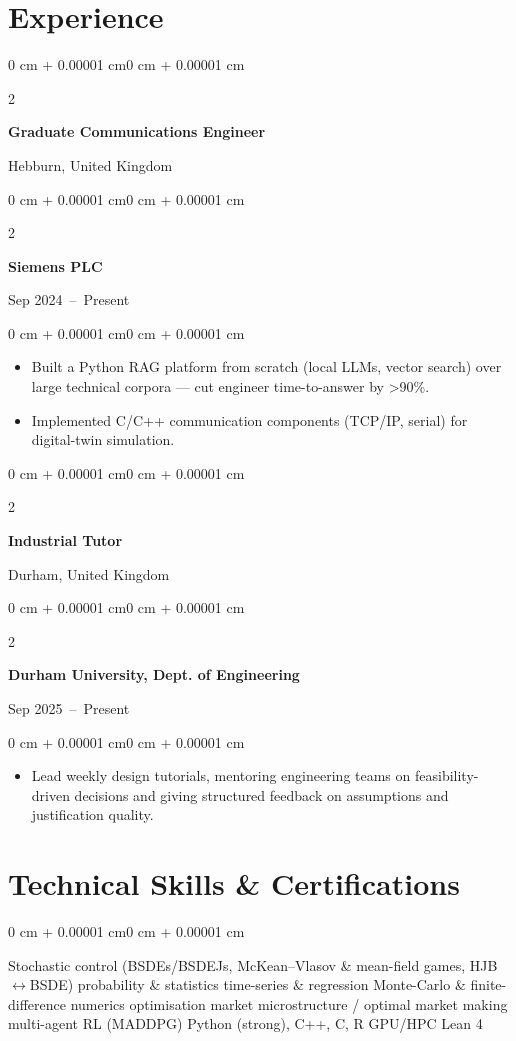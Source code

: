 \documentclass[10pt, letterpaper]{article}
\newenvironment{highlights}{
    \begin{itemize}[
        topsep=0.10 cm,
        parsep=0.10 cm,
        partopsep=0pt,
        itemsep=0pt,
        leftmargin=0 cm + 10pt
    ]
}{
    \end{itemize}
}
\newenvironment{onecolentry}{
    \begin{adjustwidth}{0 cm + 0.00001 cm}{0 cm + 0.00001 cm}
}{
    \end{adjustwidth}
}
\newenvironment{twocolentry}[2][]{
    \onecolentry{}
    \def\secondColumn{#2}
    \setcolumnwidth{\fill, 4.5 cm}
    \begin{paracol}{2}
}{
    \switchcolumn{} \raggedleft{} \secondColumn{}
    \end{paracol}
    \endonecolentry{}
}
\begin{document}
\section*{Experience}

\begin{twocolentry}
  {Hebburn, United Kingdom}
  \textbf{Graduate Communications Engineer}
\end{twocolentry}
\begin{twocolentry}
  {Sep 2024~--~Present}
  \textbf{Siemens PLC}
\end{twocolentry}
\vspace{0.10 cm}
\begin{onecolentry}
  \begin{highlights}
    \item Built a Python RAG platform from scratch (local LLMs, vector search) over large technical corpora --- cut engineer time-to-answer by >90\%.
    \item Implemented C/C++ communication components (TCP/IP, serial) for digital-twin simulation.
  \end{highlights}
\end{onecolentry}

\vspace{0.08 cm}

\begin{twocolentry}
  {Durham, United Kingdom}
  \textbf{Industrial Tutor}
\end{twocolentry}
\begin{twocolentry}
  {Sep 2025~--~Present}
  \textbf{Durham University, Dept. of Engineering}
\end{twocolentry}
\vspace{0.10 cm}
\begin{onecolentry}
  \begin{highlights}
    \item Lead weekly design tutorials, mentoring engineering teams on feasibility-driven decisions and giving structured feedback on assumptions and justification quality.
  \end{highlights}
\end{onecolentry}

\section*{Technical Skills \& Certifications}

\begin{onecolentry}
  \begin{highlights}
    Stochastic control (BSDEs/BSDEJs, McKean--Vlasov \& mean-field games, HJB$\leftrightarrow$BSDE) \textbullet{} probability \& statistics \textbullet{} time-series \& regression \textbullet{} Monte-Carlo \& finite-difference numerics \textbullet{} optimisation \textbullet{} market microstructure / optimal market making \textbullet{} multi-agent RL (MADDPG) \textbullet{} Python (strong), C++, C, R \textbullet{} GPU/HPC \textbullet{} Lean 4
  \end{highlights}
\end{onecolentry}
\end{document}
